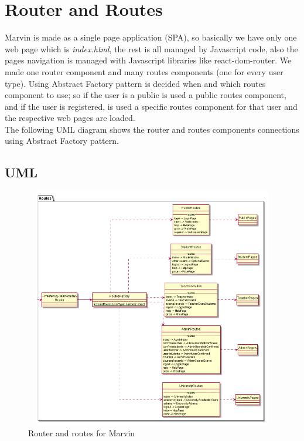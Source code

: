 \documentclass[../react.tex]{subfiles}
\begin{document}
	
	\section{Router and Routes} Marvin is made as a single page application (SPA), so basically we have only one web page which is \textit{index.html}, the rest is all managed by Javascript code, also the pages navigation is managed with Javascript libraries like react-dom-router. We made one router component and many routes components (one for every user type). Using Abstract Factory pattern is decided when and which routes component to use; so if the user is a public is used a public routes component, and if the user is registered, is used a specific routes component for that user and the respective web pages are loaded. \\
	The following UML diagram shows the router and routes components connections using Abstract Factory pattern.
		\subsection{UML}
			\begin{figure}[h]
			\centering
			\includegraphics[width=13cm,height=10.5cm]{"diagrammi/react/routes"}
			\caption{Router and routes for Marvin}
			\label{fig:Router and routes for Marvin}
		\end{figure}
		\newpage
	
\end{document}
